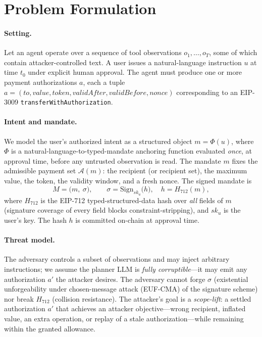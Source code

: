 \documentclass[10pt,twocolumn,letterpaper]{article}
\begin{document}
\section{Problem Formulation}

\paragraph{Setting.} Let an agent operate over a sequence of tool observations $o_1,\dots,o_T$, some of which contain attacker-controlled text. A user issues a natural-language instruction $u$ at time $t_0$ under explicit human approval. The agent must produce one or more payment authorizations $a$, each a tuple $a=(\textit{to},\textit{value},\textit{token},\textit{validAfter},\textit{validBefore},\textit{nonce})$ corresponding to an EIP-3009 \texttt{transferWithAuthorization}.

\paragraph{Intent and mandate.} We model the user's authorized intent as a structured object $m=\Phi(u)$, where $\Phi$ is a natural-language-to-typed-mandate anchoring function evaluated \emph{once}, at approval time, before any untrusted observation is read. The mandate $m$ fixes the admissible payment set $\mathcal{A}(m)$: the recipient (or recipient set), the maximum value, the token, the validity window, and a fresh nonce. The signed mandate is
\begin{equation}
M = \big(m,\ \sigma\big),\qquad \sigma = \mathrm{Sign}_{sk_u}\!\big(h\big),\quad h=H_{712}(m),
\label{eq:mandate}
\end{equation}
where $H_{712}$ is the EIP-712 typed-structured-data hash over \emph{all} fields of $m$ (signature coverage of every field blocks constraint-stripping), and $sk_u$ is the user's key. The hash $h$ is committed on-chain at approval time.

\paragraph{Threat model.} The adversary controls a subset of observations and may inject arbitrary instructions; we assume the planner LLM is \emph{fully corruptible}---it may emit any authorization $a'$ the attacker desires. The adversary cannot forge $\sigma$ (existential unforgeability under chosen-message attack (EUF-CMA) of the signature scheme) nor break $H_{712}$ (collision resistance). The attacker's goal is a \emph{scope-lift}: a settled authorization $a'$ that achieves an attacker objective---wrong recipient, inflated value, an extra operation, or replay of a stale authorization---while remaining within the granted allowance.
\end{document}
